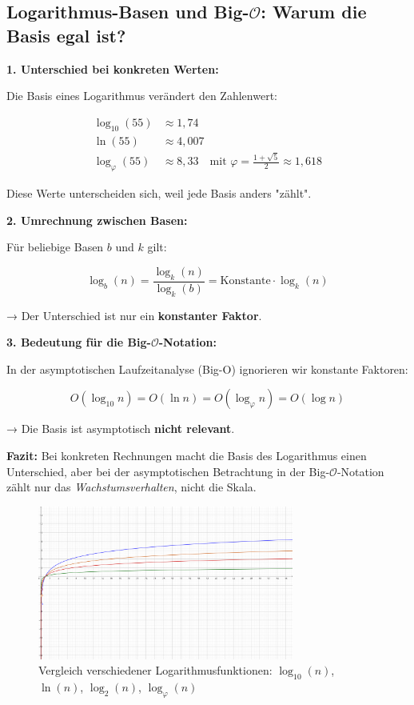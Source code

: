 \documentclass[a4paper,12pt]{article}
\begin{document}
	\subsection*{Logarithmus-Basen und Big-\( \mathcal{O} \): Warum die Basis egal ist?}
	
	\textbf{1. Unterschied bei konkreten Werten:}
	
	Die Basis eines Logarithmus verändert den Zahlenwert:
	
	\begin{align*}
		\log_{10}(55) &\approx 1{,}74 \\
		\ln(55) &\approx 4{,}007 \\
		\log_\varphi(55) &\approx 8{,}33 \quad \text{mit } \varphi = \frac{1 + \sqrt{5}}{2} \approx 1{,}618
	\end{align*}
	
	Diese Werte unterscheiden sich, weil jede Basis anders "zählt".
	
	\vspace{1em}
	\textbf{2. Umrechnung zwischen Basen:}
	
	Für beliebige Basen \( b \) und \( k \) gilt:
	
	\[
	\log_b(n) = \frac{\log_k(n)}{\log_k(b)} = \text{Konstante} \cdot \log_k(n)
	\]
	
	→ Der Unterschied ist nur ein \textbf{konstanter Faktor}.
	
	\vspace{1em}
	\textbf{3. Bedeutung für die Big-\( \mathcal{O} \)-Notation:}
	
	In der asymptotischen Laufzeitanalyse (Big-O) ignorieren wir konstante Faktoren:
	
	\[
	O(\log_{10} n) = O(\ln n) = O(\log_\varphi n) = O(\log n)
	\]
	
	→ Die Basis ist asymptotisch \textbf{nicht relevant}.
	
	\vspace{1em}
	\textbf{Fazit:}  
	Bei konkreten Rechnungen macht die Basis des Logarithmus einen Unterschied,  
	aber bei der asymptotischen Betrachtung in der Big-\( \mathcal{O} \)-Notation zählt nur das \emph{Wachstumsverhalten}, nicht die Skala.
	\begin{figure}[h!]
		\centering
		\includegraphics[width=0.75\textwidth]{geogebra-export.png}
		\caption{Vergleich verschiedener Logarithmusfunktionen: \(\log_{10}(n)\), \(\ln(n)\), \(\log_{2}(n)\), \(\log_{\varphi}(n)\)}
		\label{fig:log-vergleich}
	\end{figure}
	
\end{document}
